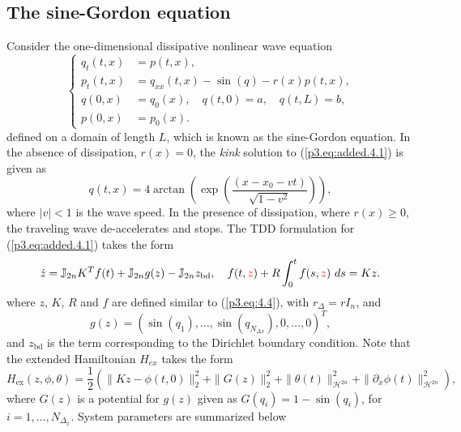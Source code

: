 \subsection{The sine-Gordon equation}
Consider the one-dimensional dissipative nonlinear wave equation
\begin{equation} \label{p3.eq:added.4.1}
	\left\{
	\begin{aligned}
		q_{t}(t,x) &= p(t,x), \\
		p_{t}(t,x) &= q_{xx}(t,x) - \sin(q) - r(x)  p(t,x), \\
		q(0,x) &= q_0(x), \quad q(t,0) = a, \quad q(t,L) = b,\\
		p(0,x) &= p_0(x).
	\end{aligned}
	\right.
\end{equation}
defined on a domain of length $L$, which is known as the sine-Gordon equation. In the absence of dissipation, $r(x) = 0$, the \emph{kink} solution to (\ref{p3.eq:added.4.1}) is given as
\begin{equation} \label{p3.eq:added.4.2}
	q(t,x) = 4\arctan\left( \exp \left( \frac{(x-x_0 - vt)}{\sqrt{1-v^2}} \right) \right),
\end{equation}
where $|v|< 1$ is the wave speed. In the presence of dissipation, where $r(x)\geq 0$, the traveling wave de-accelerates and stops. The TDD formulation for (\ref{p3.eq:added.4.1}) takes the form
\begin{equation} \label{p3.eq:added.4.3}
	\dot z = \mathbb J_{2n} K^T f(t) + \mathbb J_{2n} g(z) - \mathbb J_{2n} z_{\text{bd}}, \quad f(t,\edit{z}) + R \int_0^t f(s,\edit{z}) \ ds = K z.	
\end{equation}
where $z$, $K$, $R$ and $f$ are defined similar to (\ref{p3.eq:4.4}), with $r_{\Delta} = rI_{n}$, and 
\begin{equation}
g(z) = (\sin(q_1),\dots,\sin(q_{N_{\Delta x}}),0,\dots,0)^T,
\end{equation}
and $z_{\text{bd}}$ is the term corresponding to the Dirichlet boundary condition. Note that the extended Hamiltonian $H_{ex}$ takes the form
\begin{equation}
	H_\text{ex}(z,\phi,\theta) = \frac 1 2 \left( \| Kz - \phi(t,0) \|_2^2 + \| G(z) \|_2^2 + \| \theta(t) \|^2_{\mathcal H^{2n} } + \| \partial_x\phi(t)\|^2_{\mathcal H^{2n} }\right),
\end{equation}
where $G(z)$ is a potential for $g(z)$ given as $G(q_i) = 1 - \sin(q_i)$, for $i=1,\dots,N_{\Delta_x}$. System parameters are summarized below

